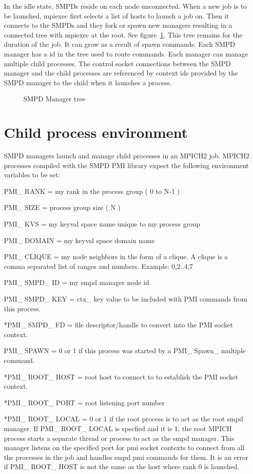 \documentclass{article}
\begin{document}
In the idle state, SMPDs reside on each node unconnected.  
When a new job is to be launched, mpiexec first selects a list of hosts 
to launch a job on.  Then it connects to the SMPDs and they fork or spawn 
new managers resulting in a connected tree with mpiexec at the root.
See figure~\ref{fig:tree}.  This tree remains for the duration of the job.
It can grow as a result of spawn commands.  Each SMPD manager has
a id in the tree used to route commands.  Each manager can manage multiple
child processes.  The control socket connections between the SMPD manager
and the child processes are referenced by context ids provided by the
SMPD manager to the child when it launches a process.

\begin{figure}
\centerline{}
\caption{SMPD Manager tree}
\label{fig:tree}
\end{figure}

\section{Child process environment}
SMPD managers launch and manage child processes in an MPICH2 job.
MPICH2 processes compiled with the SMPD PMI library expect the following
environment variables to be set:

\begin{description}
\item PMI\_ RANK = my rank in the process group ( 0 to N-1 )
\item PMI\_ SIZE = process group size ( N )
\item PMI\_ KVS = my keyval space name unique to my process group
\item PMI\_ DOMAIN = my keyval space domain name
\item *PMI\_ CLIQUE = my node neighbors in the form of a clique.  A clique is
a comma separated list of ranges and numbers.  Example: 0,2..4,7
\item PMI\_ SMPD\_ ID = my smpd manager node id
\item PMI\_ SMPD\_ KEY = ctx\_ key value to be included with PMI commands 
from this process.
\item **PMI\_ SMPD\_ FD = file descriptor/handle to convert into the PMI 
socket context.
\item PMI\_ SPAWN = 0 or 1 if this process was started by a 
PMI\_ Spawn\_ multiple command.
\item **PMI\_ ROOT\_ HOST = root host to connect to to establish the PMI 
socket context.
\item **PMI\_ ROOT\_ PORT = root listening port number
\item **PMI\_ ROOT\_ LOCAL = 0 or 1 if the root process is to act as the root smpd manager.
If PMI\_ ROOT\_ LOCAL is specfied and it is 1, the root MPICH process starts a separate
thread or process to act as the smpd manager.  This manager listens on the specified port
for pmi socket contexts to connect from all the processes in the job and handles smpd pmi
commands for them.  It is an error if PMI\_ ROOT\_ HOST is not the same as the host where
rank 0 is launched.
\end{description}
\end{document}
